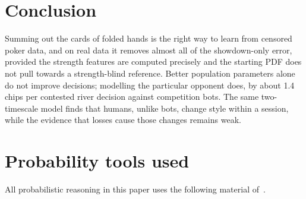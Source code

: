 \documentclass[11pt,a4paper]{article}
\newcommand{\1}{\mathbf{1}}
\begin{document}
\section{Conclusion}

Summing out the cards of folded hands is the right way to learn from censored
poker data, and on real data it removes almost all of the showdown-only error,
provided the strength features are computed precisely and the starting PDF does
not pull towards a strength-blind reference. Better population parameters alone
do not improve decisions; modelling the particular opponent does, by about
1.4 chips per contested river decision against competition bots. The same
two-timescale model finds that humans, unlike bots, change style within a
session, while the evidence that losses cause those changes remains weak.

\appendix
\section{Probability tools used}\label{app:tools}
All probabilistic reasoning in this paper uses the following material
of~\cite{bertsekas2000}.
\end{document}
